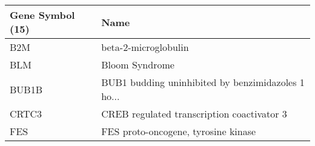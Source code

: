 \begin{tabular}{ll}
\toprule
Gene Symbol (15) &                                               Name \\
\midrule
             B2M &                               beta-2-microglobulin \\
             BLM &                                     Bloom Syndrome \\
           BUB1B & BUB1 budding uninhibited by benzimidazoles 1 ho... \\
           CRTC3 &         CREB regulated transcription coactivator 3 \\
             FES &                FES proto-oncogene, tyrosine kinase \\
\bottomrule
\end{tabular}
